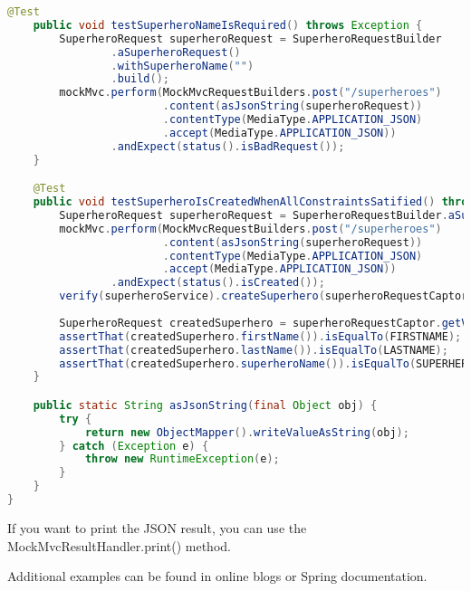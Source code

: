 \begin{lstlisting}[language=java, frame=single]
	@Test
	public void testSuperheroNameIsRequired() throws Exception {
		SuperheroRequest superheroRequest = SuperheroRequestBuilder
				.aSuperheroRequest()
				.withSuperheroName("")
				.build();
		mockMvc.perform(MockMvcRequestBuilders.post("/superheroes")
						.content(asJsonString(superheroRequest))
						.contentType(MediaType.APPLICATION_JSON)
						.accept(MediaType.APPLICATION_JSON))
				.andExpect(status().isBadRequest());
	}

	@Test
	public void testSuperheroIsCreatedWhenAllConstraintsSatified() throws Exception {
		SuperheroRequest superheroRequest = SuperheroRequestBuilder.aSuperheroRequest().build();
		mockMvc.perform(MockMvcRequestBuilders.post("/superheroes")
						.content(asJsonString(superheroRequest))
						.contentType(MediaType.APPLICATION_JSON)
						.accept(MediaType.APPLICATION_JSON))
				.andExpect(status().isCreated());
		verify(superheroService).createSuperhero(superheroRequestCaptor.capture());
		
		SuperheroRequest createdSuperhero = superheroRequestCaptor.getValue();
		assertThat(createdSuperhero.firstName()).isEqualTo(FIRSTNAME);
		assertThat(createdSuperhero.lastName()).isEqualTo(LASTNAME);
		assertThat(createdSuperhero.superheroName()).isEqualTo(SUPERHERO_NAME);
	}

	public static String asJsonString(final Object obj) {
		try {
			return new ObjectMapper().writeValueAsString(obj);
		} catch (Exception e) {
			throw new RuntimeException(e);
		}
	}
}
\end{lstlisting}

If you want to print the JSON result, you can use the MockMvcResultHandler.print() method.	
	
Additional examples can be found in online blogs \cite{mockmvc} or Spring documentation. 	

